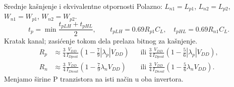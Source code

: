 \begin{frame}[label=09_3-s009]{Srednje kašnjenje i ekvivalentne otpornosti}
Polazno: $L_{n1}=L_{p1}$, $L_{n2}=L_{p2}$, $W_{n1}=W_{p1}$, $W_{n2}=W_{p2}$.
\[t_p=\min\frac{t_{pLH}+t_{pHL}}2,\qquad t_{pLH}=0.69R_{p1}C_L,\quad t_{pHL}=0.69R_{n1}C_L.\]
Kratak kanal; zasićenje tokom dela prelaza bitnog za kašnjenje.
\[\begin{aligned}
R_p&\approx\frac34\frac{V_{DD}}{I_{Dpsat}}\left(1-\frac79|\lambda_p|V_{DD}\right)
 &&\text{ili }\frac34\frac{V_{DD}}{I_{Dpsat}}\left(1-\frac56|\lambda_p|V_{DD}\right),\\[5pt]
R_n&\approx\frac34\frac{V_{DD}}{I_{Dnsat}}\left(1-\frac79\lambda_nV_{DD}\right)
 &&\text{ili }\frac34\frac{V_{DD}}{I_{Dnsat}}\left(1-\frac56\lambda_nV_{DD}\right).
\end{aligned}\]
Menjamo širine P tranzistora na isti način u oba invertora.
\end{frame}
